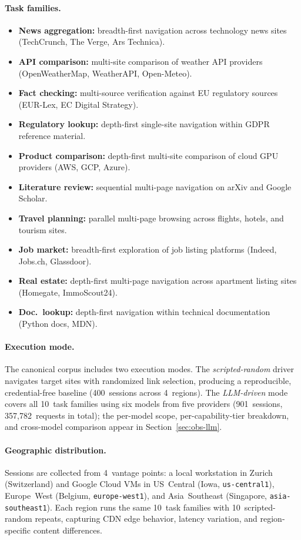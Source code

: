 \documentclass[10pt,sigconf,letterpaper,anonymous,nonacm]{acmart}
\begin{document}
\paragraph{Task families.}
\begin{itemize}
\item \textbf{News aggregation:} breadth-first navigation across
  technology news sites (TechCrunch, The Verge, Ars Technica).
\item \textbf{API comparison:} multi-site comparison of weather API
  providers (OpenWeatherMap, WeatherAPI, Open-Meteo).
\item \textbf{Fact checking:} multi-source verification against EU
  regulatory sources (EUR-Lex, EC Digital Strategy).
\item \textbf{Regulatory lookup:} depth-first single-site navigation
  within GDPR reference material.
\item \textbf{Product comparison:} depth-first multi-site comparison
  of cloud GPU providers (AWS, GCP, Azure).
\item \textbf{Literature review:} sequential multi-page navigation
  on arXiv and Google Scholar.
\item \textbf{Travel planning:} parallel multi-page browsing across
  flights, hotels, and tourism sites.
\item \textbf{Job market:} breadth-first exploration of job listing
  platforms (Indeed, Jobs.ch, Glassdoor).
\item \textbf{Real estate:} depth-first multi-page navigation
  across apartment listing sites (Homegate, ImmoScout24).
\item \textbf{Doc.\ lookup:} depth-first navigation within
  technical documentation (Python docs, MDN).
\end{itemize}

\paragraph{Execution mode.}
The canonical corpus includes two execution modes.  The \emph{scripted-random}
driver navigates target sites with randomized link selection, producing
a reproducible, credential-free baseline (400~sessions across
4~regions).  The \emph{LLM-driven} mode covers all 10~task families
using six models from five providers (901~sessions, 357{,}782~requests
in total); the per-model scope, per-capability-tier breakdown, and
cross-model comparison appear in Section~\ref{sec:obs-llm}.

\paragraph{Geographic distribution.}
Sessions are collected from 4~vantage points: a local workstation
in Zurich (Switzerland) and Google Cloud VMs in US~Central
(Iowa, \texttt{us-central1}), Europe~West (Belgium,
\texttt{europe-west1}), and Asia~Southeast (Singapore,
\texttt{asia-southeast1}).  Each region runs the same 10~task
families with 10~scripted-random repeats, capturing CDN edge
behavior, latency variation, and region-specific content
differences.
\end{document}

